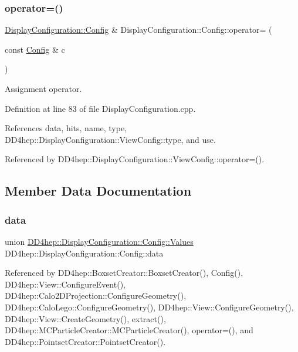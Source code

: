 \subsubsection{\texorpdfstring{operator=()}{operator=()}}
{\footnotesize\ttfamily \hyperlink{class_d_d4hep_1_1_display_configuration_1_1_config}{Display\+Configuration\+::\+Config} \& Display\+Configuration\+::\+Config\+::operator= (\begin{DoxyParamCaption}\item[{const \hyperlink{class_d_d4hep_1_1_display_configuration_1_1_config}{Config} \&}]{c }\end{DoxyParamCaption})}



Assignment operator. 



Definition at line 83 of file Display\+Configuration.\+cpp.



References data, hits, name, type, D\+D4hep\+::\+Display\+Configuration\+::\+View\+Config\+::type, and use.



Referenced by D\+D4hep\+::\+Display\+Configuration\+::\+View\+Config\+::operator=().



\subsection{Member Data Documentation}
\hypertarget{class_d_d4hep_1_1_display_configuration_1_1_config_aae403badb7228f69c1f7fecb726e6a99}{}\label{class_d_d4hep_1_1_display_configuration_1_1_config_aae403badb7228f69c1f7fecb726e6a99} 
\subsubsection{\texorpdfstring{data}{data}}
{\footnotesize\ttfamily union \hyperlink{union_d_d4hep_1_1_display_configuration_1_1_config_1_1_values}{D\+D4hep\+::\+Display\+Configuration\+::\+Config\+::\+Values}  D\+D4hep\+::\+Display\+Configuration\+::\+Config\+::data}



Referenced by D\+D4hep\+::\+Boxset\+Creator\+::\+Boxset\+Creator(), Config(), D\+D4hep\+::\+View\+::\+Configure\+Event(), D\+D4hep\+::\+Calo2\+D\+Projection\+::\+Configure\+Geometry(), D\+D4hep\+::\+Calo\+Lego\+::\+Configure\+Geometry(), D\+D4hep\+::\+View\+::\+Configure\+Geometry(), D\+D4hep\+::\+View\+::\+Create\+Geometry(), extract(), D\+D4hep\+::\+M\+C\+Particle\+Creator\+::\+M\+C\+Particle\+Creator(), operator=(), and D\+D4hep\+::\+Pointset\+Creator\+::\+Pointset\+Creator().

